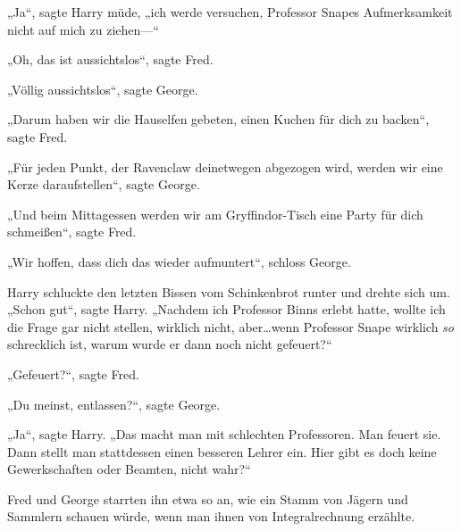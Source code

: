 „Ja“, sagte Harry müde, „ich werde versuchen, Professor Snapes Aufmerksamkeit nicht auf mich zu ziehen—“

„Oh, das ist aussichtslos“, sagte Fred.

„Völlig aussichtslos“, sagte George.

„Darum haben wir die Hauselfen gebeten, einen Kuchen für dich zu backen“, sagte Fred.

„Für jeden Punkt, der Ravenclaw deinetwegen abgezogen wird, werden wir eine Kerze daraufstellen“, sagte George.

„Und beim Mittagessen werden wir am Gryffindor-Tisch eine Party für dich schmeißen“, sagte Fred.

„Wir hoffen, dass dich das wieder aufmuntert“, schloss George.

Harry schluckte den letzten Bissen vom Schinkenbrot runter und drehte sich um. „Schon gut“, sagte Harry. „Nachdem ich Professor Binns erlebt hatte, wollte ich die Frage gar nicht stellen, wirklich nicht, aber…wenn Professor Snape wirklich \emph{so} schrecklich ist, warum wurde er dann noch nicht gefeuert?“

„Gefeuert?“, sagte Fred.

„Du meinst, entlassen?“, sagte George.

„Ja“, sagte Harry. „Das macht man mit schlechten Professoren. Man feuert sie. Dann stellt man stattdessen einen besseren Lehrer ein. Hier gibt es doch keine Gewerkschaften oder Beamten, nicht wahr?“

Fred und George starrten ihn etwa so an, wie ein Stamm von Jägern und Sammlern schauen würde, wenn man ihnen von Integralrechnung erzählte.

